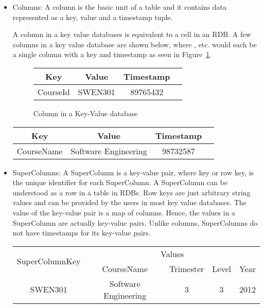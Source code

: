 \begin{itemize}
\item Columns:  A column is the basic unit of a table and it contains data represented
as a key, value and a timestamp tuple.

A column in a key value databases is equivalent to a cell in an \ac{RDB}. A few
columns in a key value database are shown below,
where ,  etc. would
each be a single column with a key and timestamp as seen in
Figure~\ref{f:column-in-kvdb}.

\begin{figure}[h]
	\centering
	\begin{tabular}{ c c c c }
		\toprule
		\textbf{Key} & \textbf{Value} & \textbf{Timestamp} \\
		\midrule
		CourseId & SWEN301 & 89765432\\		
		\bottomrule
	\end{tabular}
	\caption{Column in a Key-Value database}\label{f:column-in-kvdb}
\end{figure}

\begin{table}[h]
	\centering
	\begin{tabular}{ c c c c }
		\toprule
		\textbf{Key} & \textbf{Value} & \textbf{Timestamp} \\
		\midrule
		CourseName & Software Engineering & 98732587\\
		\bottomrule
	\end{tabular}
\end{table}

\item SuperColumns: A SuperColumn is a key-value pair, where key or row key, is
the unique identifier for each SuperColumn. A SuperColumn can be understood as a row
in a table in \acp{RDB}. Row keys are just arbitrary string values and can be
provided by the users in most key value databases. The value of the key-value
pair is a map of columns. Hence, the values in a SuperColumn are actually
key-value pairs. Unlike columns, SuperColumns do not have timestamps for its
key-value pairs.

\begin{table}[h]
	\centering
	\begin{tabular}{ c c c c c }
		\toprule
		\multirow{2}{*}{SuperColumnKey} & \multicolumn{4}{c}{Values}\\

		& CourseName & Trimester & Level & Year\\ 
		\midrule
		SWEN301 & Software Engineering & 3 & 3 & 2012\\
		\bottomrule
	\end{tabular}
\end{table}


\end{itemize}
